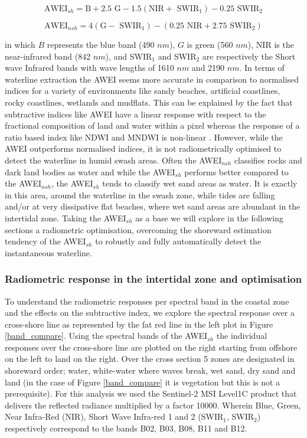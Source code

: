 \documentclass[remotesensing,technicalnote,submit,pdftex,moreauthors]{Definitions/mdpi}
\begin{document}
\begin{equation}
    \textrm{AWEI$_{sh}$} = \textrm{B} + 2.5\textrm{ G} - 1.5 (\textrm{NIR} + \textrm{ SWIR$_{1}$}) - 0.25 \textrm{ SWIR$_{2}$}
\end{equation}

\begin{equation}
    \textrm{AWEI$_{nsh}$} = 4 (\textrm{G} - \textrm{ SWIR$_{1}$}) - (0.25 \textrm{ NIR} + 2.75 \textrm{ SWIR$_{2}$})
\end{equation}

in which $B$ represents the blue band (490 $nm$), $G$ is green (560 $nm$), NIR is the near-infrared band (842 $nm$), and SWIR$_{1}$ and SWIR$_{2}$ are respectively the Short wave Infrared bands with wave lengths of 1610 $nm$ and 2190 $nm$. In terms of waterline extraction the AWEI seems more accurate in comparison to normalised indices for a variety of environments like sandy beaches, artificial coastlines, rocky coastlines, wetlands and mudflats. This can be explained by the fact that subtractive indices like AWEI have a linear response with respect to the fractional composition of land and water within a pixel whereas the response of a ratio based index like NDWI and MNDWI is non-linear \citep{Bishop_sub_pixel}. However, while the AWEI outperforms normalised indices, it is not radiometrically optimised to detect the waterline in humid swash areas. Often the AWEI$_{nsh}$ classifies rocks and dark land bodies as water and while the AWEI$_{sh}$ performs better compared to the AWEI$_{nsh}$, the AWEI$_{sh}$ tends to classify wet sand areas as water. It is exactly in this area, around the waterline in the swash zone, while tides are falling and/or at very dissipative flat beaches, where wet sand areas are abundant in the intertidal zone. Taking the AWEI$_{sh}$ as a base we will explore in the following sections a radiometric optimisation, overcoming the shoreward estimation tendency of the AWEI$_{sh}$ to robustly and fully automatically detect the instantaneous waterline.

\subsubsection{Radiometric response in the intertidal zone and optimisation}
To understand the radiometric responses per spectral band in the coastal zone and the effects on the subtractive index, we explore the spectral response over a cross-shore line as represented by the fat red line in the left plot in Figure \ref{band_compare}. Using the spectral bands of the AWEI$_{sh}$ the individual responses over the cross-shore line are plotted on the right starting from offshore on the left to land on the right. Over the cross section 5 zones are designated in shoreward order; water, white-water where waves break, wet sand, dry sand and land (in the case of Figure \ref{band_compare} it is vegetation but this is not a prerequisite). For this analysis we used the Sentinel-2 MSI Level1C product that delivers the reflected radiance multiplied by a factor 10000. Wherein Blue, Green, Near Infra-Red (NIR), Short Wave Infra-red 1 and 2 (SWIR$_{1}$, SWIR$_{2}$) respectively correspond to the bands B02, B03, B08, B11 and B12.
\end{document}
